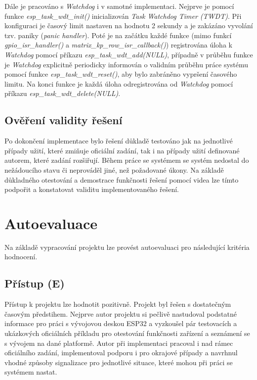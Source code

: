 \documentclass[a4paper, 12pt]{article}
\begin{document}
Dále je pracováno s \textit{Watchdog} i v samotné implementaci. Nejprve je pomocí funkce \textit{esp\_task\_wdt\_init()} inicializován \textit{Task Watchdog Timer (TWDT)}. Při konfiguraci je časový limit nastaven na hodnotu 2 sekundy a je zakázáno vyvolání tzv. paniky (\textit{panic handler}). Poté je na začátku každé funkce (mimo funkcí \textit{gpio\_isr\_handler()} a \textit{matrix\_kp\_row\_isr\_callback()}) registrována úloha k \textit{Watchdog} pomocí příkazu \textit{esp\_task\_wdt\_add(NULL)}, případně v průběhu funkce je \textit{Watchdog} explicitně periodicky informován o validním průběhu práce systému pomocí funkce \textit{esp\_task\_wdt\_reset()}, aby bylo zabráněno vypršení časového limitu. Na konci funkce je každá úloha odregistrována od \textit{Watchdog} pomocí příkazu \textit{esp\_task\_wdt\_delete(NULL)}.

\subsection{Ověření validity řešení}
Po dokončení implementace bylo řešení důkladě testováno jak na jednotlivé případy užití, které zmiňuje oficiální zadání, tak i na případy užití definované autorem, které zadání rozšiřují. Během práce se systémem se systém nedostal do nežádoucího stavu či neprováděl jiné, než požadované úkony. Na základě důkladného otestování a demostrace funkčnosti řešení pomocí videa lze tímto podpořit a konstatovat validitu implementovaného řešení.

\newpage

\section{Autoevaluace}
Na základě vypracování projektu lze provést autoevaluaci pro následující kritéria hodnocení.

\subsection{Přístup (E)}
Přístup k projektu lze hodnotit pozitivně. Projekt byl řešen s dostatečným časovým předstihem. Nejprve autor projektu si pečlivě nastudoval podstatné informace pro práci s vývojovou deskou ESP32 a vyzkoušel pár testovacích a ukázkových oficiálních příkladu pro otestování funkčnosti zařízení a seznámení se s vývojem na dané platformě. Autor při implementaci pracoval i nad rámec oficiálního zadání, implementoval podporu i pro okrajové případy a navrhnul vhodné způsoby signalizace pro jednotlivé situace, které mohou při práci se systémem nastat.
\end{document}
